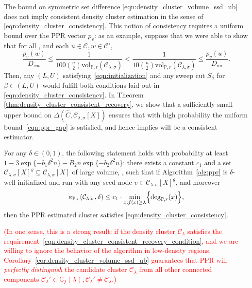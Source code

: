 \documentclass[11pt,twoside]{article}
\newcommand{\1}{\mathbf{1}}
\newcommand{\mc}[1]{\mathcal{#1}}
\newcommand{\Pbb}{\mathbb{P}}
\newcommand{\wh}[1]{\widehat{#1}}
\newcommand{\vol}{\mathrm{vol}}
\begin{document}
The bound on symmetric set difference \eqref{eqn:density_cluster_volume_ssd_ub} does not imply consistent density cluster estimation in the sense of \eqref{eqn:density_cluster_consistency}. This notion of consistency requires a
uniform bound over the PPR vector $p_v$: as an example, suppose that we were
able to show that for all \smash{$\mc{C}' \in \mathbb{C}_f(\lambda), \mc{C}' \neq \mc{C}$}, and each $u \in \mc{C}, w \in \mc{C}'$,  
\begin{equation}
\label{eqn:ppr_gap}
\frac{p_v(w)}{D_{ww}} \leq \frac{1}{100 {n \choose 2} \vol_{\Pbb,r}(\mc{C}_{\lambda,\sigma})} <
\frac{1}{10 {n \choose 2} \vol_{\Pbb,r}(\mc{C}_{\lambda,\sigma})} \leq \frac{p_v(u)}{D_{uu}}. 
\end{equation}
Then, any $(L,U)$ satisfying~\eqref{eqn:initialization} and any sweep cut
$S_{\beta}$ for $\beta \in (L,U)$ would fulfill both conditions laid out in
\eqref{eqn:density_cluster_consistency}. In Theorem 
\ref{thm:density_cluster_consistent_recovery}, we show that a sufficiently 
small upper bound on $\Delta(\wh{C},\mc{C}_{\lambda,\sigma}[X])$ ensures that with high probability the uniform bound~\eqref{eqn:ppr_gap} is satisfied, and hence implies
\smash{$\wh{C}$} will be a consistent estimator.
\begin{theorem}
	\label{thm:density_cluster_consistent_recovery}
	For any $\delta \in (0,1)$, the following statement holds with probability at least $1 - 3\exp\{-b_1\delta^2n\} - B_2n\exp\{-b_2\delta^2n\}$: there exists a constant $c_1$ and a set $\mc{C}_{\lambda,\sigma}[X]^g \subseteq \mc{C}_{\lambda,\sigma}[X]$ of large volume,  \smash{$\vol_{n,r}(\mc{C}_{\lambda,\sigma}[X]^g) \geq\vol_{n,r}(\mc{C}_{\lambda,\sigma}[X])/2$}, such that if Algorithm~\ref{alg:ppr} is $\delta$-well-initialized and run with any seed node $v \in \mc{C}_{\lambda,\sigma}[X]^g$, and moreover
	\begin{equation}
	\label{eqn:density_cluster_consistent_recovery_condition}
	\kappa_{\Pbb,r}(\mc{C}_{\lambda,\sigma},\delta) \leq c_1 \cdot \min_{x: f(x) \geq \lambda} \Bigl\{\deg_{\Pbb,r}(x)\Bigr\},
	\end{equation}
then the PPR estimated cluster \smash{$\wh{C}$} satisfies \eqref{eqn:density_cluster_consistency}.
\end{theorem}
\textcolor{red}{(In one sense, this is a strong result: if the density cluster $\mc{C}_{\lambda}$ satisfies the requirement~\eqref{eqn:density_cluster_consistent_recovery_condition}, and we are willing to ignore the behavior of the algorithm in low-density regions, Corollary~\ref{cor:density_cluster_volume_ssd_ub} guarantees that PPR will \emph{perfectly distinguish} the candidate cluster $\mc{C}_{\lambda}$ from all other connected components $\mc{C}_{\lambda}' \in \mathbb{C}_f(\lambda), \mc{C}_\lambda' \not= \mc{C}_{\lambda}$.)}\vspace{1 mm}
\end{document}
